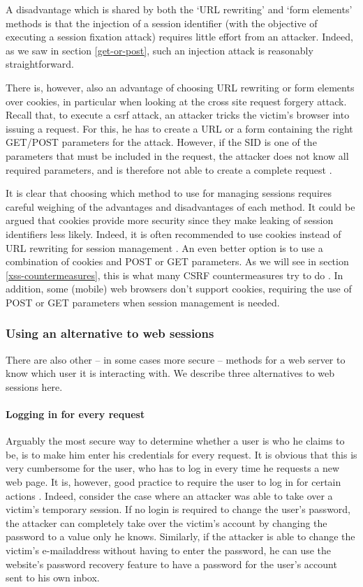 A disadvantage which is shared by both the `URL rewriting' and `form elements' methods is that the injection of a session identifier (with the objective of executing a session fixation attack) requires little effort from an attacker. Indeed, as we saw in section \ref{get-or-post}, such an injection attack is reasonably straightforward.

There is, however, also an advantage of choosing URL rewriting or form elements over cookies, in particular when looking at the cross site request forgery attack. Recall that, to execute a \gls{csrf} attack, an attacker tricks the victim's browser into issuing a request. For this, he  has to create a URL or a form containing the right GET/POST parameters for the attack. However, if the SID is one of the parameters that must be included in the request, the attacker does not know all required parameters, and is therefore not able to create a complete request \cite{Johnston2004}.

It is clear that choosing which method to use for managing sessions requires careful weighing of the advantages and disadvantages of each method. It could be argued that cookies provide more security since they make leaking of session identifiers less likely. Indeed, it is often recommended to use cookies instead of URL rewriting for session management \cite{Zhong2006,Vamosi2006}. An even better option is to use a combination of cookies and POST or GET parameters. As we will see in section \ref{xss-countermeasures}, this is what many CSRF countermeasures try to do \cite{Jovanovic2006,Johns2006}. In addition, some (mobile) web browsers don't support cookies, requiring the use of POST or GET parameters when session management is needed.

\subsubsection{Using an alternative to web sessions}

There are also other -- in some cases more secure -- methods for a web server to know which user it is interacting with. We describe three alternatives to web sessions here.

\paragraph{Logging in for every request}
Arguably the most secure way to determine whether a user is who he claims to be, is to make him enter his credentials for every request. It is obvious that this is very cumbersome for the user, who has to log in every time he requests a new web page. It is, however, good practice to require the user to log in for certain actions \cite{Webers2008}. Indeed, consider the case where an attacker was able to take over a victim's temporary session. If no login is required to change the user's password, the attacker can completely take over the victim's account by changing the password to a value only he knows. Similarly, if the attacker is able to change the victim's e-mailaddress without having to enter the password, he can use the website's password recovery feature to have a password for the user's account sent to his own inbox.

